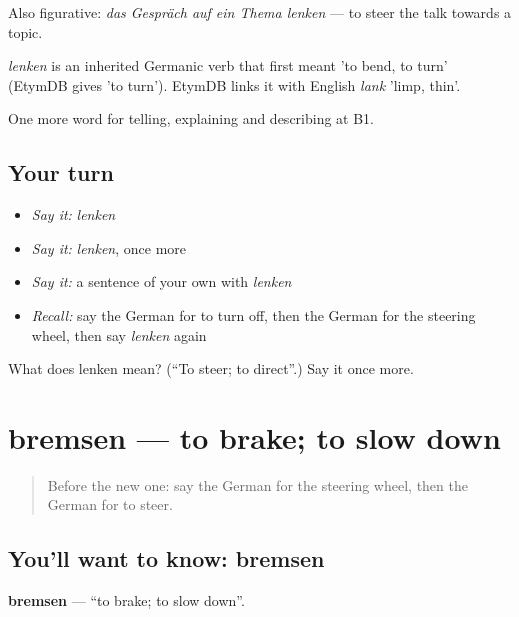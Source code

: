 Also figurative: \emph{das Gespräch auf ein Thema lenken} — to steer the talk towards a topic.

\begin{cousinweb}
\emph{lenken} is an inherited Germanic verb that first meant 'to bend, to turn' (EtymDB gives 'to turn'). EtymDB links it with English \emph{lank} 'limp, thin'.
\end{cousinweb}

\begin{grammarlens}[title={What you've built}]
One more word for telling, explaining and describing at B1.
\end{grammarlens}

\subsection*{Your turn}
\begin{itemize}
\raggedright
  \item \emph{Say it:} \emph{lenken}
  \item \emph{Say it:} \emph{lenken}, once more
  \item \emph{Say it:} a sentence of your own with \emph{lenken}
  \item \emph{Recall:} say the German for to turn off, then the German for the steering wheel, then say \emph{lenken} again
\end{itemize}

\begin{tcolorbox}[breakable,colback=teal!4,colframe=teal!35!black,title={Before you move on}]
What does lenken mean? (\textquotedblleft{}To steer; to direct\textquotedblright{}.) Say it once more.
\end{tcolorbox}
\section[bremsen]{bremsen — to brake; to slow down}

\label{lesson:GE-C399-bremsen}



\begin{quote}
Before the new one: say the German for the steering wheel, then the German for to steer.
\end{quote}

\subsection*{You'll want to know: bremsen}
\textbf{bremsen} — \textquotedblleft{}to brake; to slow down\textquotedblright{}.


